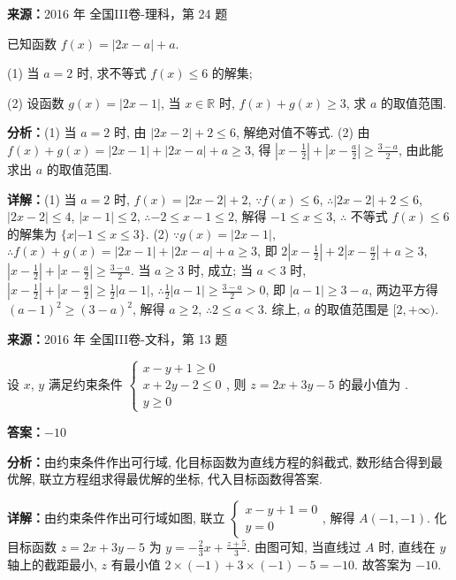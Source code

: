 \begin{question}[points=10]
\textbf{来源：}2016 年 全国III卷-理科，第 24 题\par
[选修4-5：不等式选讲]

已知函数 $f(x)=|2x-a|+a$.

(1) 当 $a=2$ 时, 求不等式 $f(x)\le6$ 的解集;

(2) 设函数 $g(x)=|2x-1|$, 当 $x\in\mathbb{R}$ 时, $f(x)+g(x)\ge3$, 求 $a$ 的取值范围.
\begin{solution}

\textbf{分析：}(1) 当 $a=2$ 时, 由 $|2x-2|+2\le6$, 解绝对值不等式. (2) 由 $f(x)+g(x)=|2x-1|+|2x-a|+a\ge3$, 得 $|x-\frac{1}{2}|+|x-\frac{a}{2}|\ge\frac{3-a}{2}$, 由此能求出 $a$ 的取值范围.

\textbf{详解：}(1) 当 $a=2$ 时, $f(x)=|2x-2|+2$, $\because f(x)\le6$, $\therefore|2x-2|+2\le6$, $|2x-2|\le4$, $|x-1|\le2$, $\therefore-2\le x-1\le2$, 解得 $-1\le x\le3$, $\therefore$ 不等式 $f(x)\le6$ 的解集为 $\{x|-1\le x\le3\}$.
(2) $\because g(x)=|2x-1|$, $\therefore f(x)+g(x)=|2x-1|+|2x-a|+a\ge3$, 即 $2|x-\frac{1}{2}|+2|x-\frac{a}{2}|+a\ge3$, $|x-\frac{1}{2}|+|x-\frac{a}{2}|\ge\frac{3-a}{2}$. 当 $a\ge3$ 时, 成立; 当 $a<3$ 时, $|x-\frac{1}{2}|+|x-\frac{a}{2}|\ge\frac{1}{2}|a-1|$, $\therefore\frac{1}{2}|a-1|\ge\frac{3-a}{2}>0$, 即 $|a-1|\ge3-a$, 两边平方得 $(a-1)^2\ge(3-a)^2$, 解得 $a\ge2$, $\therefore2\le a<3$. 综上, $a$ 的取值范围是 $[2,+\infty)$.
\end{solution}
\end{question}

\begin{question}[points=5]
\textbf{来源：}2016 年 全国III卷-文科，第 13 题\par
设 $x$, $y$ 满足约束条件 $\begin{cases}x-y+1\ge 0\\ x+2y-2\le 0\\ y\ge 0\end{cases}$, 则 $z=2x+3y-5$ 的最小值为 .
\fillin[{$-10$}]
\begin{solution}
\textbf{答案：}$-10$

\textbf{分析：}由约束条件作出可行域, 化目标函数为直线方程的斜截式, 数形结合得到最优解, 联立方程组求得最优解的坐标, 代入目标函数得答案.

\textbf{详解：}由约束条件作出可行域如图, 联立 $\begin{cases}x-y+1=0\\ y=0\end{cases}$, 解得 $A(-1,-1)$. 化目标函数 $z=2x+3y-5$ 为 $y=-\frac{2}{3}x+\frac{z+5}{3}$. 由图可知, 当直线过 $A$ 时, 直线在 $y$ 轴上的截距最小, $z$ 有最小值 $2\times(-1)+3\times(-1)-5=-10$. 故答案为 $-10$.
\end{solution}
\end{question}

